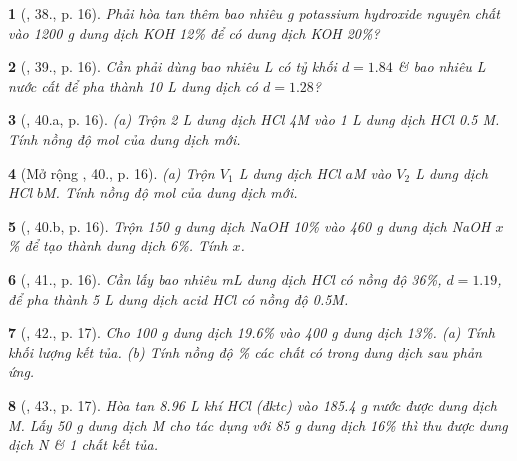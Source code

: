 \documentclass{article}
\newtheorem{baitoan}{}
\begin{document}
\begin{baitoan}[\cite{An_400_BT_Hoa_Hoc_9}, 38., p. 16]
	Phải hòa tan thêm bao nhiêu {\rm g} potassium hydroxide nguyên chất vào {\rm1200 g} dung dịch {\rm KOH 12\%} để có dung dịch {\rm KOH 20\%}?
\end{baitoan}

\begin{baitoan}[\cite{An_400_BT_Hoa_Hoc_9}, 39., p. 16]
	Cần phải dùng bao nhiêu {\rm L } có tỷ khối $d = 1.84$ \& bao nhiêu {\rm L} nước cất để pha thành {\rm10 L} dung dịch {\rm{}} có $d = 1.28$?
\end{baitoan}

\begin{baitoan}[\cite{An_400_BT_Hoa_Hoc_9}, 40.a, p. 16]
	(a) Trộn {\rm2 L} dung dịch {\rm HCl 4M} vào {\rm 1 L} dung dịch {\rm HCl 0.5 M}. Tính nồng độ mol của dung dịch mới.
\end{baitoan}

\begin{baitoan}[Mở rộng \cite{An_400_BT_Hoa_Hoc_9}, 40., p. 16]
	(a) Trộn $V_1$ {\rm L} dung dịch {\rm HCl $a$M} vào $V_2$ {\rm L} dung dịch {\rm HCl $b$M}. Tính nồng độ mol của dung dịch mới.
\end{baitoan}

\begin{baitoan}[\cite{An_400_BT_Hoa_Hoc_9}, 40.b, p. 16]
	Trộn {\rm150 g} dung dịch {\rm NaOH 10\%} vào {\rm460 g} dung dịch {\rm NaOH $x$\%} để tạo thành dung dịch {\rm6\%}. Tính $x$.
\end{baitoan}

\begin{baitoan}[\cite{An_400_BT_Hoa_Hoc_9}, 41., p. 16]
	Cần lấy bao nhiêu {\rm mL} dung dịch {\rm HCl} có nồng độ {\rm36\%}, $d = 1.19$, để pha thành {\rm5 L} dung dịch acid {\rm HCl} có nồng độ {\rm0.5M}.
\end{baitoan}

\begin{baitoan}[\cite{An_400_BT_Hoa_Hoc_9}, 42., p. 17]
	Cho {\rm100 g} dung dịch {\rm{} 19.6\%} vào {\rm400 g} dung dịch {\rm{} 13\%}. (a) Tính khối lượng kết tủa. (b) Tính nồng độ {\rm\%} các chất có trong dung dịch sau phản ứng.
\end{baitoan}

\begin{baitoan}[\cite{An_400_BT_Hoa_Hoc_9}, 43., p. 17]
	Hòa tan {\rm8.96 L} khí {\rm HCl} (đktc) vào {\rm185.4 g} nước được dung dịch M. Lấy {\rm50 g} dung dịch M cho tác dụng với {\rm85 g} dung dịch {\rm{} 16\%} thì thu được dung dịch N \& 1 chất kết tủa.
\end{baitoan}
\end{document}

